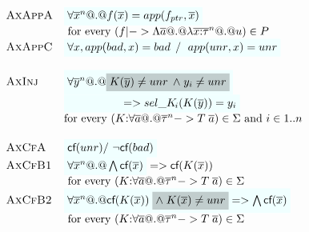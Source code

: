 {\[\begin{array}{c}
\begin{array}{lll}
 \textsc{AxAppA}  & \formula{\forall \oln{x}{n} @.@ f(\ol{x}) = app(f_{ptr},\xs)} \\
                  & \text{ for every } (f |-> \Lambda\as @.@ \lambda\oln{x{:}\tau}{n} @.@ u) \in P \\
 \textsc{AxAppC}  & \formula{\forall x, app(\bad,x) = \bad \; /\ \; app(\unr,x) = \unr}    \\ \\
 \textsc{AxInj}   & \formula{\forall \oln{y}{n} @.@ \highlight{K(\ys) \neq \unr\;\land\; y_i \neq \unr}} \\
                  & \formula{\quad\qquad\qquad => \sel{K}{i}(K(\ys)) = y_i} \\
                  & \text{for every } (K{:}\forall\as @.@ \oln{\tau}{n} -> T\;\as) \in \Sigma \text{ and } i \in 1..n \\ \\
 \textsc{AxCfA}   & \formula{\lcf{\unr} /\ \lncf{\bad}} \\
 \textsc{AxCfB1}  & \formula{\forall \oln{x}{n} @.@ \bigwedge\lcf{\ol{x}}} => \lcf{K(\ol{x})} \\
                  & \text{ for every } (K{:}\forall\as @.@ \oln{\tau}{n} -> T\;\as) \in \Sigma \\
 \textsc{AxCfB2}  & \formula{\forall \oln{x}{n} @.@ \lcf{K(\ol{x})}\;\highlight{\land\;K(\ol{x}) \neq \unr} => \bigwedge\lcf{\ol{x}}} \\
                  & \text{ for every } (K{:}\forall\as @.@ \oln{\tau}{n} -> T\;\as) \in \Sigma
\end{array}
\end{array}\]}


